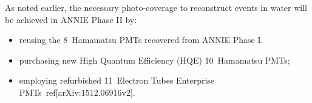  As noted earlier, the necessary photo-coverage to reconstruct events in water %
 will be achieved in ANNIE Phase II by:
 \begin{itemize}
   \item reusing the 8\inch~Hamamatsu PMTs recovered from ANNIE Phase I.
   \item purchasing new High Quantum Efficiency (HQE) 10\inch~Hamamatsu PMTs;
   \item employing refurbished 11\inch~Electron Tubes Enterprise PMTs~ref[arXiv:1512.06916v2].
 \end{itemize}
 
 \begin{figure}
   \centering
    \qquad
    \qquad

\end{figure}
